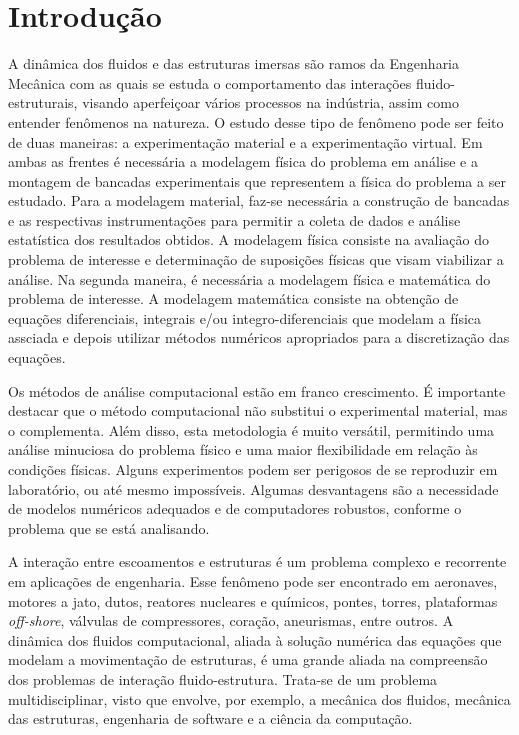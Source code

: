 \chapter{Introdução}\label{chap_intro}

\thispagestyle{empty} %
\vspace{3ex}

A dinâmica dos fluidos e das estruturas imersas são ramos da Engenharia Mecânica com as quais se estuda o comportamento das interações fluido-estruturais, visando aperfeiçoar vários processos na indústria, assim como entender fenômenos na natureza. O estudo desse tipo de fenômeno pode ser feito de duas maneiras: a experimentação material e a experimentação virtual. Em ambas as frentes é necessária a modelagem física do problema em análise e a montagem de bancadas experimentais que representem a física do problema a ser estudado. Para a modelagem material, faz-se necessária a construção de bancadas e as respectivas instrumentações para permitir a coleta de dados e análise estatística dos resultados obtidos. A modelagem física consiste na avaliação do problema de interesse e determinação de suposições físicas que visam viabilizar a análise. Na segunda maneira, é necessária a modelagem física e matemática do problema de interesse. A modelagem matemática consiste na obtenção de equações diferenciais, integrais e/ou integro-diferenciais que modelam a física assciada e depois utilizar métodos numéricos apropriados para a discretização das equações. 

Os métodos de análise computacional estão em franco crescimento. É importante destacar que o método computacional não substitui o experimental material, mas o complementa. Além disso, esta metodologia é muito versátil, permitindo uma análise minuciosa do problema físico e uma maior flexibilidade em relação às condições físicas. Alguns experimentos podem ser perigosos de se reproduzir em laboratório, ou até mesmo impossíveis. Algumas desvantagens são a necessidade de modelos numéricos adequados e de computadores robustos, conforme o problema que se está analisando.

A interação entre escoamentos e estruturas é um problema complexo e recorrente em aplicações de engenharia. Esse fenômeno pode ser encontrado em aeronaves, motores a jato, dutos, reatores nucleares e químicos, pontes, torres, plataformas \textit{off-shore}, válvulas de compressores, coração, aneurismas, entre outros. A dinâmica dos fluidos computacional, aliada à solução numérica das equações que modelam a movimentação de estruturas, é uma grande aliada na compreensão dos problemas de interação fluido-estrutura. Trata-se de um problema multidisciplinar, visto que envolve, por exemplo, a mecânica dos fluidos, mecânica das estruturas, engenharia de software e a ciência da computação.

